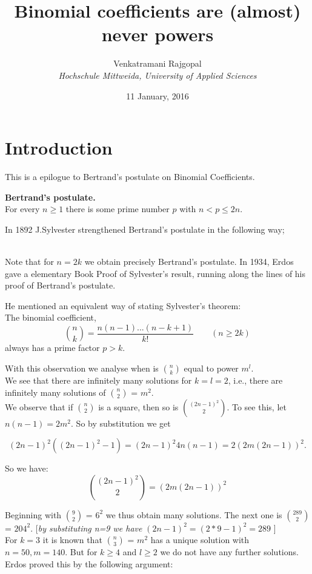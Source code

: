 \documentclass[a4paper]{article}
\title{Binomial coefficients are (almost) never powers}
\author{Venkatramani Rajgopal\\
\textit{Hochschule Mittweida, University of Applied Sciences}}
\date{11 January, 2016}
\begin{document}
\maketitle

\section{Introduction}
This is a epilogue to Bertrand's postulate on Binomial Coefficients. \\

\begin{tcolorbox}
\textbf{Bertrand’s postulate.} \\
For every $n \geq 1$ there is some prime number $p$ with $n < p \leq 2n$.\\
\end {tcolorbox}

In 1892 J.Sylvester strengthened Bertrand’s postulate in the following way;

\\

Note that for \(n = 2k\) we obtain precisely Bertrand’s postulate. In 1934, Erdos gave a elementary Book Proof of Sylvester’s result, running
along the lines of his proof of Bertrand’s postulate.\\

\begin{tcolorbox}
He mentioned an equivalent way of stating Sylvester’s theorem:\\
The binomial coefficient,
\[ {n\choose k}=\dfrac{n(n-1)...(n-k+1)}{k!}   \qquad (n\ge2k) \]
always has a prime factor $p>k$. \\
\end{tcolorbox}

With this observation we analyse when is $n \choose k$ equal to power $m^l$. \\
We see that there are infinitely many solutions for $k=l=2$, i.e., there are infinitely many solutions of $n \choose 2$ = $m^2$. \\
We observe that if  $n \choose 2$ is a square, then so is $(2n-1)^2 \choose 2$. To see this, let $n(n-1) = 2m^2$. So by substitution we get

$$(2n-1)^2((2n-1)^2-1) = (2n-1)^2 4n(n-1) = 2(2m(2n-1))^2.$$

So we have:
$${(2n-1)^2 \choose 2} = (2m(2n-1))^2 $$

Beginning with $9 \choose 2$ = $6^2$ we thus obtain many solutions.
The next one is $289 \choose 2$ = $204^2$. [\textit{by substituting n=9 we have} $(2n-1)^2 = (2*9-1)^2 = 289$ ] \\
For $k=3$ it is known that $n \choose 3$ = $m^2$ has a unique solution with $n=50, m=140$.
But for $k \geq 4$ and $l \geq 2$ we do not have any further solutions. Erdos proved this by the following argument:
\end{document}
